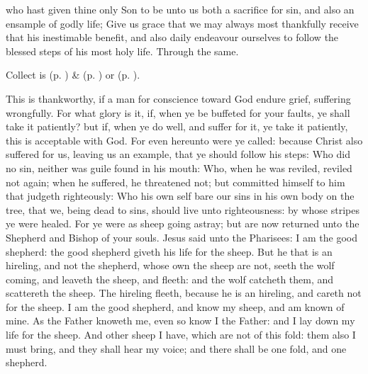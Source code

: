 \collect\label{EasterIICollect}
 who hast given thine only Son to be unto us both a sacrifice for sin, and also an ensample of godly life; Give us grace that we may always most thankfully receive that his inestimable benefit, and also daily endeavour ourselves to follow the blessed steps of his most holy life. Through the same.
\begin{rubric}
     Collect is  (p. \pageref{SPMaryInEaster}) \&   (p. \pageref{SPAgainst}) or  (p. \pageref{SPChiefBishop}).
\end{rubric}
 This is thankworthy, if a man for conscience toward God endure grief, suffering wrongfully. For what glory is it, if, when ye be buffeted for your faults, ye shall take it patiently? but if, when ye do well, and suffer for it, ye take it patiently, this is acceptable with God. For even hereunto were ye called: because Christ also suffered for us, leaving us an example, that ye should follow his steps: Who did no sin, neither was guile found in his mouth: Who, when he was reviled, reviled not again; when he suffered, he threatened not; but committed himself to him that judgeth righteously: Who his own self bare our sins in his own body on the tree, that we, being dead to sins, should live unto righteousness: by whose stripes ye were healed. For ye were as sheep going astray; but are now returned unto the Shepherd and Bishop of your souls.
 Jesus said unto the Pharisees: I am the good shepherd: the good shepherd giveth his life for the sheep. But he that is an hireling, and not the shepherd, whose own the sheep are not, seeth the wolf coming, and leaveth the sheep, and fleeth: and the wolf catcheth them, and scattereth the sheep. The hireling fleeth, because he is an hireling, and careth not for the sheep. I am the good shepherd, and know my sheep, and am known of mine. As the Father knoweth me, even so know I the Father: and I lay down my life for the sheep. And other sheep I have, which are not of this fold: them also I must bring, and they shall hear my voice; and there shall be one fold, and one shepherd.
